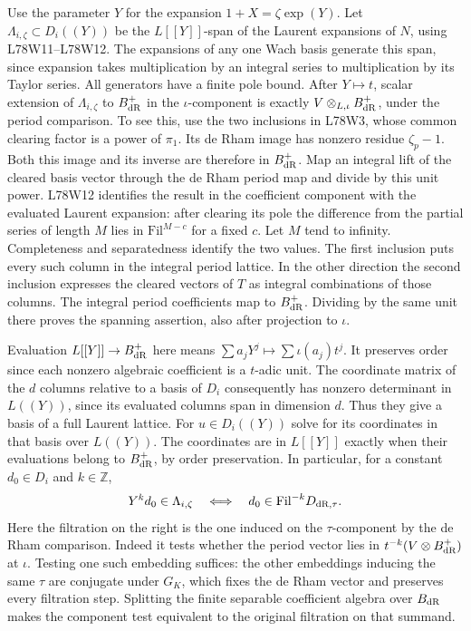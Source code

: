 Use the parameter $Y$ for the expansion $1+X=\zeta\exp(Y)$.
Let $\Lambda_{i,\zeta}\subset D_i((Y))$ be the $L[[Y]]$-span
of the Laurent expansions of $N$, using L78W11--L78W12.
The expansions of any one Wach basis generate this span, since
expansion takes multiplication by an integral series to multiplication
by its Taylor series. All generators have a finite pole bound.
After $Y\mapsto t$, scalar extension of $\Lambda_{i,\zeta}$ to
$B_{\rm dR}^+$ in the $\iota$-component is exactly
$V\otimes_{L,\iota}B_{\rm dR}^+$, under the period comparison.
To see this, use the two inclusions in L78W3, whose common clearing
factor is a power of $\pi_1$. Its de Rham image has nonzero residue
$\zeta_p-1$. Both this image and its inverse are therefore in
$B_{\rm dR}^+$. Map an integral lift of the cleared basis vector
through the de Rham period map and divide by this unit power.
L78W12 identifies the result in the coefficient component with
the evaluated Laurent expansion: after clearing its pole the
difference from the partial series of length $M$ lies in
$\mathrm{Fil}^{M-c}$ for a fixed $c$. Let $M$ tend to infinity.
Completeness and separatedness identify the two values.
The first inclusion puts every such column in the integral
period lattice. In the other direction the second inclusion
expresses the cleared vectors of $T$ as integral combinations
of those columns. The integral period coefficients map to
$B_{\rm dR}^+$. Dividing by the same unit there proves the spanning
assertion, also after projection to $\iota$.

Evaluation $L[[Y]]\to B_{\rm dR}^+$ here means
$\sum a_jY^j\mapsto\sum\iota(a_j)t^j$.
It preserves order since each nonzero algebraic coefficient is a
$t$-adic unit. The coordinate matrix of the $d$ columns relative
to a basis of $D_i$ consequently has nonzero determinant in
$L((Y))$, since its evaluated columns span in dimension $d$.
Thus they give a basis of a full Laurent lattice. For $u\in D_i((Y))$
solve for its coordinates in that basis over $L((Y))$.
The coordinates are in $L[[Y]]$ exactly when their evaluations
belong to $B_{\rm dR}^+$, by order preservation. In particular,
for a constant $d_0\in D_i$ and $k\in\mathbb Z$,
\[
 Y^k d_0\in\Lambda_{i,\zeta}
     \quad\Longleftrightarrow\quad
 d_0\in\mathrm{Fil}^{-k}D_{{\rm dR},\tau}.
\]
Here the filtration on the right is the one induced on the
$\tau$-component by the de Rham comparison.
Indeed it tests whether the period vector lies in
$t^{-k}(V\otimes B_{\rm dR}^+)$ at $\iota$. Testing one such
embedding suffices: the other embeddings inducing the same $\tau$
are conjugate under $G_K$, which fixes the de Rham vector and
preserves every filtration step. Splitting the finite separable
coefficient algebra over $B_{\rm dR}$ makes the component test
equivalent to the original filtration on that summand.

